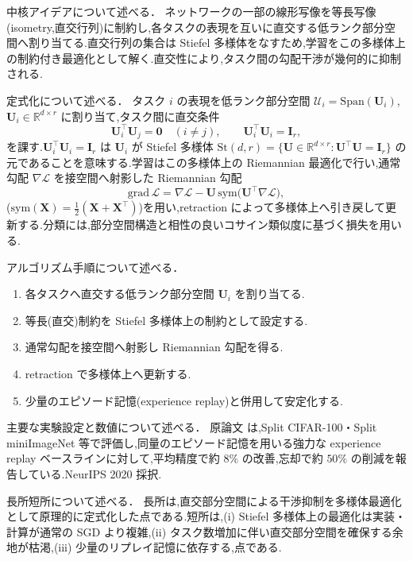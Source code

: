 中核アイデアについて述べる．
ネットワークの一部の線形写像を等長写像(isometry,直交行列)に制約し,各タスクの表現を互いに直交する低ランク部分空間へ割り当てる.直交行列の集合は Stiefel 多様体をなすため,学習をこの多様体上の制約付き最適化として解く.直交性により,タスク間の勾配干渉が幾何的に抑制される.

定式化について述べる．
タスク $i$ の表現を低ランク部分空間 $\mathcal{U}_i = \mathrm{Span}(\mathbf{U}_i)$,$\mathbf{U}_i \in \mathbb{R}^{d \times r}$ に割り当て,タスク間に直交条件
\begin{equation}
\mathbf{U}_i^\top \mathbf{U}_j = \mathbf{0} \quad (i \neq j), \qquad \mathbf{U}_i^\top \mathbf{U}_i = \mathbf{I}_r,
\end{equation}
を課す.$\mathbf{U}_i^\top \mathbf{U}_i = \mathbf{I}_r$ は $\mathbf{U}_i$ が Stiefel 多様体 $\mathrm{St}(d,r) = \{\mathbf{U} \in \mathbb{R}^{d\times r} : \mathbf{U}^\top \mathbf{U} = \mathbf{I}_r\}$ の元であることを意味する.学習はこの多様体上の Riemannian 最適化で行い,通常勾配 $\nabla \mathcal{L}$ を接空間へ射影した Riemannian 勾配
\begin{equation}
\mathrm{grad}\,\mathcal{L} = \nabla \mathcal{L} - \mathbf{U}\,\mathrm{sym}\!\big(\mathbf{U}^\top \nabla \mathcal{L}\big),
\end{equation}
($\mathrm{sym}(\mathbf{X}) = \tfrac{1}{2}(\mathbf{X} + \mathbf{X}^\top)$)を用い,retraction によって多様体上へ引き戻して更新する.分類には,部分空間構造と相性の良いコサイン類似度に基づく損失を用いる.

アルゴリズム手順について述べる．
\begin{enumerate}
\item 各タスクへ直交する低ランク部分空間 $\mathbf{U}_i$ を割り当てる.
\item 等長(直交)制約を Stiefel 多様体上の制約として設定する.
\item 通常勾配を接空間へ射影し Riemannian 勾配を得る.
\item retraction で多様体上へ更新する.
\item 少量のエピソード記憶(experience replay)と併用して安定化する.
\end{enumerate}

主要な実験設定と数値について述べる．
原論文 \cite{lowrankorth} は,Split CIFAR-100・Split miniImageNet 等で評価し,同量のエピソード記憶を用いる強力な experience replay ベースラインに対して,平均精度で約 $8\%$ の改善,忘却で約 $50\%$ の削減を報告している.NeurIPS 2020 採択.

長所短所について述べる．
長所は,直交部分空間による干渉抑制を多様体最適化として原理的に定式化した点である.短所は,(i) Stiefel 多様体上の最適化は実装・計算が通常の SGD より複雑,(ii) タスク数増加に伴い直交部分空間を確保する余地が枯渇,(iii) 少量のリプレイ記憶に依存する,点である.

